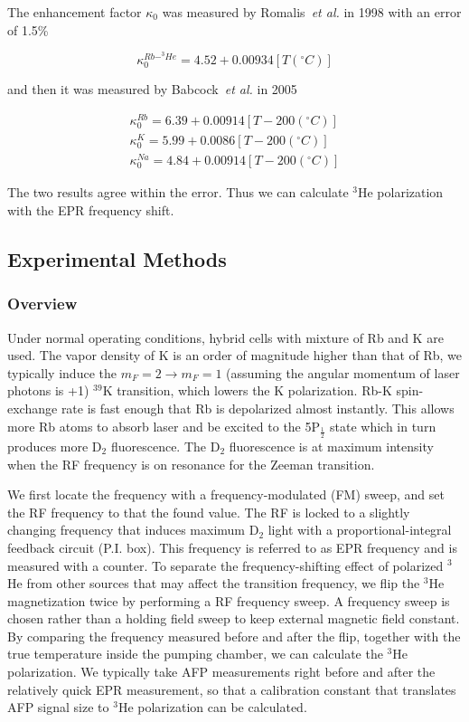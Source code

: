The enhancement factor $\kappa_{0}$ was measured by Romalis~\emph{et al.} in 1998 with an error of 1.5\%~\cite{PhysRevA.58.3004}

\begin{equation}
\kappa_{0}^{Rb-^{3}He}=4.52+0.00934[T(^{\circ}C)]
\end{equation}

and then it was measured by Babcock~\emph{et al.} in 2005

\begin{subequations}
	\begin{gather}
	\kappa_{0}^{Rb}=6.39+0.00914[T-200(^{\circ}C)]\\
	\kappa_{0}^{K}=5.99+0.0086[T-200(^{\circ}C)]\\
	\kappa_{0}^{Na}=4.84+0.00914[T-200(^{\circ}C)]
	\end{gather}
\end{subequations}

The two results agree within the error. Thus we can calculate $^{3}$He polarization with the EPR frequency shift. 

\subsection{Experimental Methods}

\subsubsection{Overview}

Under normal operating conditions, hybrid cells with mixture of Rb and K are used. The vapor density of K is an order of magnitude higher than that of Rb, we typically induce the $m_{F} = 2 \rightarrow m_{F} = 1$ (assuming the angular momentum of laser photons is +1) $^{39}$K transition, which lowers the K polarization. Rb-K spin-exchange rate is fast enough that Rb is depolarized almost instantly. This allows more Rb atoms to absorb laser and be excited to the 5P$_{\frac{1}{2}}$ state which in turn produces more D$_{2}$ fluorescence. The D$_{2}$ fluorescence is at maximum intensity when the RF frequency is on resonance for the Zeeman transition. 

We first locate the frequency with a frequency-modulated (FM) sweep, and set the RF frequency to that the found value. The RF is locked to a slightly changing frequency that induces maximum D$_{2}$ light with a proportional-integral feedback circuit (P.I. box). This frequency is referred to as EPR frequency and is measured with a counter. To separate the frequency-shifting effect of polarized $^{3}$He from other sources that may affect the transition frequency, we flip the $^{3}$He magnetization twice by performing a RF frequency sweep. A frequency sweep is chosen rather than a holding field sweep  to keep external magnetic field constant. By comparing the frequency measured before and after the flip, together with the true temperature inside the pumping chamber, we can calculate the $^{3}$He polarization. We typically take AFP measurements right before and after the relatively quick EPR measurement, so that a calibration constant that translates AFP signal size to $^{3}$He polarization can be calculated.

